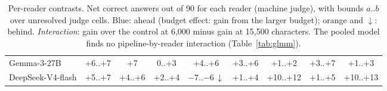 \begin{table}[t]
\begin{tabular}{@{}lcccccccc@{}}
Gemma-3-27B & \cellcolor{cPos!40!white}+6..+7 & \cellcolor{cPos!43!white}+7 & \cellcolor{cPos!15!white}0..+3 & \cellcolor{cPos!33!white}+4..+6 & \cellcolor{cPos!30!white}+3..+6 & \cellcolor{cPos!15!white}+1..+2 & \cellcolor{cPos!33!white}+3..+7 & \cellcolor{cPos!18!white}+1..+3 \\
DeepSeek-V4-flash & \cellcolor{cPos!38!white}+5..+7 & \cellcolor{cPos!33!white}+4..+6 & \cellcolor{cPos!23!white}+2..+4 & \cellcolor{cNeg!40!white}$-7$..$-6$\,$\downarrow$  & \cellcolor{cPos!20!white}+1..+4 & \cellcolor{cPos!55!white}+10..+12 & \cellcolor{cPos!23!white}+1..+5 & \cellcolor{cPos!55!white}+10..+13 \\
\bottomrule
\end{tabular}
\caption{Per-reader contrasts. Net correct answers out of 90 for each reader (machine judge), with bounds $a$..$b$ over unresolved judge cells. Blue: \lexb{} ahead (budget effect: gain from the larger budget); orange and $\downarrow$: behind. \emph{Interaction}: gain over the control at 6,000 minus gain at 15,500 characters. The pooled model finds no pipeline-by-reader interaction (Table~\ref{tab:glmm}).}
\label{tab:readers}
\end{table}
